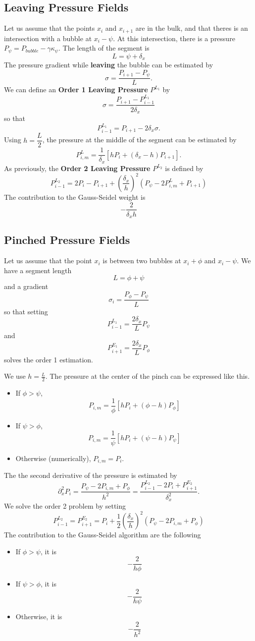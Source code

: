 \documentclass[aps]{revtex4}
\begin{document}
\subsection{Leaving Pressure Fields}
Let us assume that  the points $x_{i}$ and $x_{i+1}$ are in the bulk, and that
theres is an intersection with a bubble at $x_i-\psi$.
At this intersection, there is a pressure $P_\psi=P_{bubble} - \gamma \kappa_\psi$.
The length of the segment is
$$
	L = \psi+\delta_x
$$
The pressure gradient while \textbf{leaving} the bubble can be estimated by
$$
	\sigma = \dfrac{P_{i+1}-P_\psi}{L}.
$$
We can define an \textbf{Order 1 Leaving Pressure} $P^{L_1}$ by
$$
	\sigma = \dfrac{P_{i+1}-P^{L_1}_{i-1}}{2\delta_x}
$$
so that 
$$
	P^{L_1}_{i-1} = P_{i+1} - 2\delta_x \sigma.
$$
Using $h = \dfrac{L}{2}$, the pressure at the middle of the segment can be estimated
by
$$
	P_{i,m}^L = \dfrac{1}{\delta_x} \left\lbrack
	h P_i + \left(\delta_x - h\right) P_{i+1}
	\right\rbrack.
$$
As previously, the \textbf{Order 2 Leaving Pressure} $P^{L_2}$ is
defined by
$$
	P_{i-1}^{L_2} = 2P_i - P_{i+1} + \left(\dfrac{\delta_x}{h}\right)^2
	\left(
		P_\psi - 2P_{i,m}^L + P_{i+1}
	\right)
$$
The contribution to the Gauss-Seidel weight is
$$
	-\dfrac{2}{\delta_x h}
$$

\subsection{Pinched Pressure Fields}
Let us assume that the point $x_i$ is between two bubbles at $x_i+\phi$ and $x_i-\psi$.
We have a segment length 
$$
	L = \phi + \psi 
$$
and a gradient
$$
	\sigma_i = \dfrac{P_\phi - P_\psi}{L}
$$
so that setting
$$
	P^{L_1}_{i-1} = \dfrac{2\delta_x}{L} P_\psi
$$
and
$$
	P^{E_1}_{i+1} = \dfrac{2\delta_x}{L} P_\phi
$$
solves the order 1 estimation.

We use $h=\frac{L}{2}$.
The pressure at the center of the pinch can be expressed like this.
\begin{itemize}
\item If $\phi>\psi$, 
$$
	P_{i,m} = \dfrac{1}{\phi}
	\left\lbrack
		h P_i + \left(\phi-h\right) P_\phi
	\right\rbrack
$$
\item If $\psi>\phi$,  
	$$
		P_{i,m} = \dfrac{1}{\psi}
	\left\lbrack
		h P_i + \left(\psi-h\right) P_\psi
	\right\rbrack
$$
\item Otherwise (numerically), $P_{i,m}=P_i$.
\end{itemize}

The the second derivative of the pressure is estimated by
$$
	\partial_x^2 P_i = \dfrac{P_\psi - 2P_{i,m} + P_\phi}{h^2} =
	\dfrac{P^{L_2}_{i-1} - 2P_i + P^{E_2}_{i+1}}{\delta_x^2}.
$$
We solve the order 2 problem by setting
$$
	P^{L_2}_{i-1} = P^{E_2}_{i+1} = P_i + \dfrac{1}{2}\left(\dfrac{\delta_x}{h}\right)^2 \left( P_\psi - 2P_{i,m} + P_\phi \right)
$$
The contribution to the Gauss-Seidel algorithm are the following
\begin{itemize}
	\item If $\phi>\psi$, it is
	$$
		-\dfrac{2}{h\phi}
	$$
	\item If $\psi>\phi$, it is
	$$
		-\dfrac{2}{h\psi}
	$$
	\item Otherwise, it is 
	$$
		-\dfrac{2}{h^2}
	$$
\end{itemize}
\end{document}
